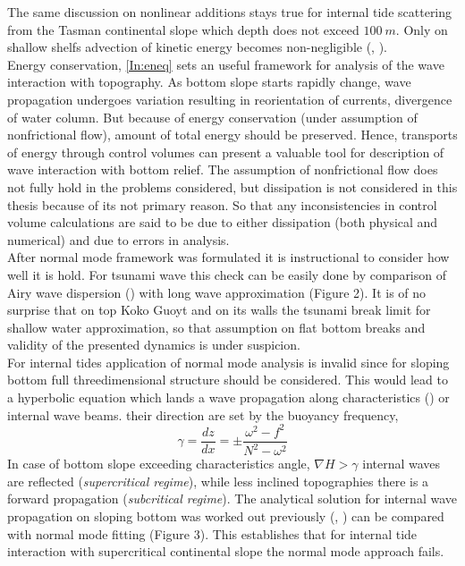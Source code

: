 The same discussion on nonlinear additions stays true for internal tide scattering from the Tasman continental slope which depth does not exceed $100~m$. Only on shallow shelfs advection of kinetic energy becomes non-negligible (\cite{kang2012energetics}, \cite{nash2012unpredictable}).\\
Energy conservation, \ref{In:eneq} sets an useful framework for analysis of the wave interaction with topography. As bottom slope starts rapidly change, wave propagation undergoes variation resulting in reorientation of currents, divergence of water column. But because of energy conservation (under assumption of nonfrictional flow), amount of total energy should be preserved. Hence, transports of energy through control volumes can present a valuable tool for description of wave interaction with bottom relief. The assumption of nonfrictional flow does not fully hold in the problems considered, but dissipation is not considered in this thesis because of its not primary reason. So that any inconsistencies in control volume calculations are said to be due to either dissipation (both physical and numerical) and due to errors in analysis.\\
After normal mode framework was formulated it is instructional to consider how well it is hold. For tsunami wave this check can be easily done by comparison of Airy wave dispersion (\cite{kundu2008fluid}) with long wave approximation (Figure 2). It is of no surprise that on top Koko Guoyt and on its walls the tsunami break limit for shallow water approximation, so that assumption on flat bottom breaks and validity of the presented dynamics is under suspicion.\\
For internal tides application of normal mode analysis is invalid since for sloping bottom full threedimensional structure should be considered. This would lead to a hyperbolic equation which lands a wave propagation along characteristics (\cite{sandstrom1969effect}) or internal wave beams. their direction are set by the buoyancy frequency,
\begin{equation}
\gamma = \frac{dz}{dx} = \pm \frac{\omega^2 - f^2}{N^2 - \omega^2}
\end{equation}
In case of bottom slope exceeding characteristics angle, $\nabla H > \gamma$ internal waves are reflected (\textit{supercritical regime}), while less inclined topographies there is a forward propagation (\textit{subcritical regime}). The analytical solution for internal wave propagation on sloping bottom was worked out previously (\cite{wunsch1968propagation}, \cite{wunsch1969progressive}) can be compared with normal mode fitting (Figure 3). This  establishes that for internal tide interaction with supercritical continental slope the normal mode approach fails. 

